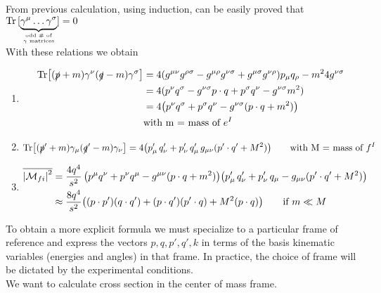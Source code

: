 \documentclass[TheoreticalPhy_ModB.tex]{subfiles}
\begin{document}
From previous calculation, using induction, can be easily proved that $\Tr \,[\underbrace{\gamma^{\mu} \dots \gamma^{\sigma}}_{\textup{odd \# of} \atop \gamma \textup{ matrices}}] = 0$\\
With these relations we obtain
\begin{enumerate}[label=$\bullet$]
\item
	\begin{align*}
	\Tr[(\slashed p + m) \gamma^{\nu}(\slashed q - m) \gamma^{\sigma}]
	& = 4(g^{\mu\nu}g^{\rho\sigma} - g^{\mu\rho}g^{\nu\sigma} + g^{\mu\sigma}g^{\nu\rho}) p_{\mu}q_{\rho} - m^2 4g^{\nu\sigma} \\
	& = 4 (p^{\nu}q^{\sigma} - g^{\nu\sigma}p \cdot q + p^{\sigma}q^{\nu} - g^{\nu\sigma}m^2) \\
	& = 4 \bigl(p^{\nu}q^{\sigma} + p^{\sigma}q^{\nu} - g^{\nu\sigma}(p \cdot q + m^2) \bigr) \\
	& \textup{with m = mass of }e^I
	\end{align*}
\item
	\[
	\Tr [(\slashed p' + m) \gamma_{\mu} (\slashed q' - m) \gamma_{\nu}]
		= 4 \bigl( p'_{\mu} \, q'_{\nu} + p'_{\nu}\, q'_{\mu} \, g_{\mu\nu}(p' \cdot q' + M^2) \bigr)
	\qquad \text{with M = mass of } f^I
	\]
\item
	\begin{align*}
	\overline{\abs{\mathcal{M}_{fi}}^2} 
	& = \frac{4q^4}{s^2} \, \bigl( p^{\mu}q^{\nu} + p^{\nu}q^{\mu} - g^{\mu\nu}(p \cdot q + m^2) \bigr)
		\bigl( p'_{\mu}\, q'_{\nu} + p'_{\nu}\, q_{\mu} - g_{\mu\nu} (p' \cdot q' + M^2) \bigr) \\
	& \approx \frac{8q^4}{s^2} \bigl( (p \cdot p')(q \cdot q') + (p \cdot q')(p' \cdot q) + M^2(p \cdot q) \bigr)
		\qquad \textup{if } m \ll M
	\end{align*}
\end{enumerate}
To obtain a more explicit formula we must specialize to a particular frame of reference and express the vectors $p, q, p', q', k$ in terms of the basis kinematic variables (energies and angles) in that frame. In practice, the choice of frame will be dictated by the experimental conditions.\\
We want to calculate cross section in the center of mass frame.

\begin{figure}[H]
\centering

\end{figure}
\end{document}
